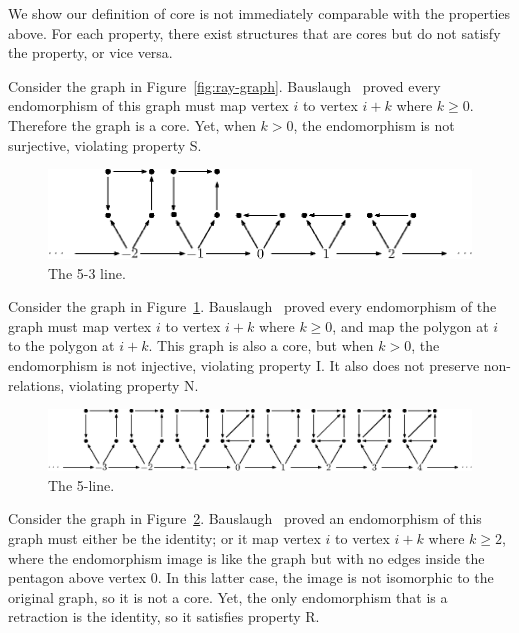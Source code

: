 \documentclass[acmsmall,screen,nonacm,review]{acmart}
\begin{document}
We show our definition of core is not immediately comparable with 
 the properties above.
For each property, there exist structures that are cores 
 but do not satisfy the property,
 or vice versa.
% 
% 
\begin{example}
    Consider the graph in Figure~\ref{fig:ray-graph}.
    Bauslaugh~\cite{bauslaugh1994homomorphisms} proved 
    every endomorphism of this graph must map vertex $i$ to 
    vertex $i+k$ where $k \geq 0$.
    Therefore the graph is a core.
    Yet, when $k > 0$, the endomorphism is not surjective,
    violating property S.
\end{example}
% 
\begin{figure}
    \centering
    \includegraphics[height=.8in]{5-3.eps}
    \caption{The 5-3 line.}
    \label{fig:5-3-line}
\end{figure}
% 
\begin{example}
    Consider the graph in Figure~\ref{fig:5-3-line}. 
    Bauslaugh~\cite{bauslaugh1994homomorphisms} proved every 
    endomorphism of the graph must map vertex $i$ to vertex $i+k$ 
    where $k \geq 0$,
    and map the polygon at $i$ to the polygon at $i+k$.
    This graph is also a core, but when $k>0$, 
    the endomorphism is not injective, violating property I.
    It also does not preserve non-relations, violating property N.
\end{example}
% 
\begin{figure}
    \centering
    \includegraphics[height=.8in]{5-line.eps}
    \caption{The 5-line.}
    \label{fig:5-line}
\end{figure}
% 
\begin{example}
    Consider the graph in Figure~\ref{fig:5-line}.
    Bauslaugh~\cite{bauslaugh1994homomorphisms} proved an 
    endomorphism of this graph must either be the identity; 
    or it map vertex $i$ to vertex $i+k$ where $k \geq 2$,
    where the endomorphism image is like the graph but with 
    no edges inside the pentagon above vertex $0$.
    In this latter case, the image is not isomorphic to 
    the original graph, so it is not a core.
    Yet, the only endomorphism that is a retraction is
    the identity, so it satisfies property R.
\end{example}
\end{document}
